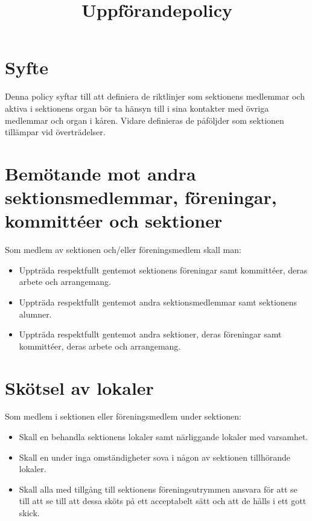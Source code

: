 \documentclass[11pt, includeaddress]{classes/cthit}
\begin{document}
\title{Uppförandepolicy}
\maketitle

\thispagestyle{empty}

\newpage

\makeheadfoot%

\setcounter{tocdepth}{2}
\setcounter{page}{1}
\tableofcontents

\newpage

\section{Syfte}
Denna policy syftar till att definiera de riktlinjer som sektionens medlemmar och aktiva i sektionens organ bör ta hänsyn till i sina kontakter med övriga medlemmar och organ i kåren. Vidare definieras de påföljder som sektionen tillämpar vid överträdelser. 

\section{Bemötande mot andra sektionsmedlemmar, föreningar, kommittéer och sektioner}
Som medlem av sektionen och/eller föreningsmedlem skall man:

\begin{itemize}
	\item Uppträda respektfullt gentemot sektionens föreningar samt kommittéer, deras arbete och arrangemang.
	\item Uppträda respektfullt gentemot andra sektionsmedlemmar samt sektionens alumner.
 	\item Uppträda respektfullt gentemot andra sektioner, deras föreningar samt kommittéer, deras arbete och arrangemang.

\end{itemize}

\section{Skötsel av lokaler}
Som medlem i sektionen eller föreningsmedlem under sektionen:

\begin{itemize}
	\item Skall en behandla sektionens lokaler samt närliggande lokaler med varsamhet.
	\item Skall en under inga omständigheter sova i någon av sektionen tillhörande lokaler.
 	\item Skall alla med tillgång till sektionens föreningsutrymmen ansvara för att se till att se till att dessa sköts på ett acceptabelt sätt och att de hålls i ett gott skick.
	
\end{itemize}
\end{document}
